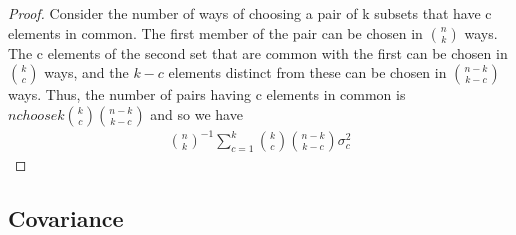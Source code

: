 \documentclass{article}
\theoremstyle{definition}
\numberwithin{Def}{section}
\begin{document}
\begin{itemize}
\begin{proof}
    Consider the number of ways of choosing a pair of k subsets that have c elements in common. The first member of the pair can be chosen in ${n \choose k}$ ways. The c elements of the second set that are common with the first can be chosen in ${k \choose c}$ ways, and the $k-c$ elements distinct from these can be chosen in ${n-k \choose k-c}$ ways. Thus, the number of pairs having c elements in common is ${n choose k}{k \choose c}{n-k \choose k-c}$ and so we have \begin{align*}
        {n \choose k}^{-1}\sum_{c=1}^k {k \choose c}{n-k \choose k-c}\sigma_c^2
    \end{align*}
    \end{proof}
\end{itemize}

\subsection{Covariance}
\end{document}
